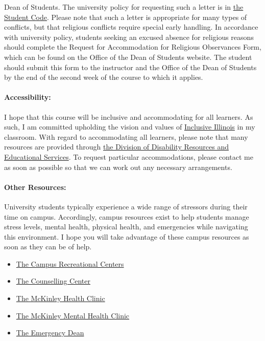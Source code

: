 \documentclass[11pt]{article}
\begin{document}
\begin{itemize}
                Dean of Students.  The university policy for requesting such a 
                letter is in 
                \href{http://studentcode.illinois.edu/article1_part5_1-501.html}{the 
                Student Code}. Please note that such a letter is appropriate 
                for many types of conflicts, but that religious conflicts 
                require special early handling. In accordance with university 
                policy, students seeking an excused absence for religious 
                reasons should complete the Request for Accommodation for 
                Religious Observances Form, which can be found on the Office of 
                the Dean of Students website. The student should submit this 
                form to the instructor and the Office of the Dean of Students 
                by the end of the second week of the course to which it 
                applies. 

\end{itemize}

\paragraph{Accessibility:} I hope that this course will be inclusive and 
accommodating for all learners. As such, I am committed upholding the vision 
and values of \href{http://www.inclusiveillinois.illinois.edu/index.html}{Inclusive Illinois}
in my 
classroom.  With regard to accommodating all learners, please note that many 
resources are provided through 
\href{http://disability.illinois.edu/academic-support/accommodations}{the 
Division of Disability Resources and Educational Services}.  To request 
particular accommodations, please contact me as soon as possible so that we can 
work out any necessary arrangements.

\paragraph{Other Resources:} 
University students typically experience a wide range of stressors during their 
time on campus. Accordingly, campus resources exist to help students manage  
stress levels, mental health, physical health, and emergencies while navigating 
this environment. I hope you will take advantage of these campus resources as 
soon as they can be of help.

\begin{itemize}
\item \href{https://campusrec.illinois.edu/}{The Campus Recreational Centers}
\item \href{http://counselingcenter.illinois.edu/}{The Counselling Center}
\item \href{https://mckinley.illinois.edu/}{The McKinley Health Clinic}
\item \href{http://www.mckinley.illinois.edu/medical-services/mental-health}{The McKinley Mental Health Clinic}
\item \href{https://odos.illinois.edu/community-of-care/emergency-dean/}{The Emergency Dean}
\end{itemize}
\end{document}
